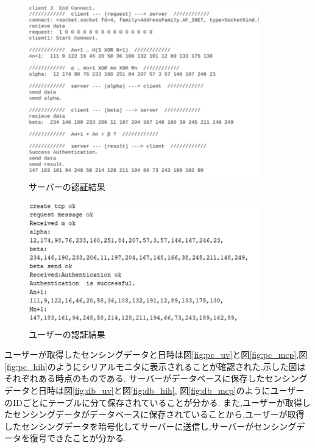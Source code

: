 \begin{figure}[H]
\begin{center}
	\includegraphics[width=10cm]{sogo_ninsyo_server_1.png}
	\caption{サーバーの認証結果}
	\label{fig:sogo_ninsyo_server_1}
\end{center}
\end{figure}
\begin{figure}[H]
\begin{center}
	\includegraphics[width=10cm]{sogo_ninsyo_uv.png}
	\caption{ユーザーの認証結果}
	\label{fig:sogo_ninsyo_uv}
\end{center}
\end{figure}


ユーザーが取得したセンシングデータと日時は図\ref{fig:pc_uv}と図\ref{fig:pc_mcp},図\ref{fig:pc_hih}のようにシリアルモニタに表示されることが確認された.示した図はそれぞれある時点のものである.
サーバーがデータベースに保存したセンシングデータと日時は図\ref{fig:db_uv}と図\ref{fig:db_hih},
図\ref{fig:db_mcp}のようにユーザーのIDごとにテーブルに分て保存されていることが分かる.
また,ユーザーが取得したセンシングデータがデータベースに保存されていることから,ユーザーが取得したセンシングデータを暗号化してサーバーに送信し,サーバーがセンシングデータを復号できたことが分かる.

